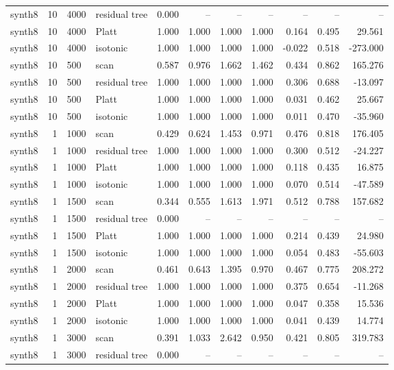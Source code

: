 \begin{tabular}{lrllrrrrrrr}
synth8 & 10 & 4000 & residual tree & 0.000 & -- & -- & -- & -- & -- & -- \\
synth8 & 10 & 4000 & Platt & 1.000 & 1.000 & 1.000 & 1.000 & 0.164 & 0.495 & 29.561 \\
synth8 & 10 & 4000 & isotonic & 1.000 & 1.000 & 1.000 & 1.000 & -0.022 & 0.518 & -273.000 \\
synth8 & 10 & 500 & scan & 0.587 & 0.976 & 1.662 & 1.462 & 0.434 & 0.862 & 165.276 \\
synth8 & 10 & 500 & residual tree & 1.000 & 1.000 & 1.000 & 1.000 & 0.306 & 0.688 & -13.097 \\
synth8 & 10 & 500 & Platt & 1.000 & 1.000 & 1.000 & 1.000 & 0.031 & 0.462 & 25.667 \\
synth8 & 10 & 500 & isotonic & 1.000 & 1.000 & 1.000 & 1.000 & 0.011 & 0.470 & -35.960 \\
synth8 & 1 & 1000 & scan & 0.429 & 0.624 & 1.453 & 0.971 & 0.476 & 0.818 & 176.405 \\
synth8 & 1 & 1000 & residual tree & 1.000 & 1.000 & 1.000 & 1.000 & 0.300 & 0.512 & -24.227 \\
synth8 & 1 & 1000 & Platt & 1.000 & 1.000 & 1.000 & 1.000 & 0.118 & 0.435 & 16.875 \\
synth8 & 1 & 1000 & isotonic & 1.000 & 1.000 & 1.000 & 1.000 & 0.070 & 0.514 & -47.589 \\
synth8 & 1 & 1500 & scan & 0.344 & 0.555 & 1.613 & 1.971 & 0.512 & 0.788 & 157.682 \\
synth8 & 1 & 1500 & residual tree & 0.000 & -- & -- & -- & -- & -- & -- \\
synth8 & 1 & 1500 & Platt & 1.000 & 1.000 & 1.000 & 1.000 & 0.214 & 0.439 & 24.980 \\
synth8 & 1 & 1500 & isotonic & 1.000 & 1.000 & 1.000 & 1.000 & 0.054 & 0.483 & -55.603 \\
synth8 & 1 & 2000 & scan & 0.461 & 0.643 & 1.395 & 0.970 & 0.467 & 0.775 & 208.272 \\
synth8 & 1 & 2000 & residual tree & 1.000 & 1.000 & 1.000 & 1.000 & 0.375 & 0.654 & -11.268 \\
synth8 & 1 & 2000 & Platt & 1.000 & 1.000 & 1.000 & 1.000 & 0.047 & 0.358 & 15.536 \\
synth8 & 1 & 2000 & isotonic & 1.000 & 1.000 & 1.000 & 1.000 & 0.041 & 0.439 & 14.774 \\
synth8 & 1 & 3000 & scan & 0.391 & 1.033 & 2.642 & 0.950 & 0.421 & 0.805 & 319.783 \\
synth8 & 1 & 3000 & residual tree & 0.000 & -- & -- & -- & -- & -- & -- \\

\end{tabular}
